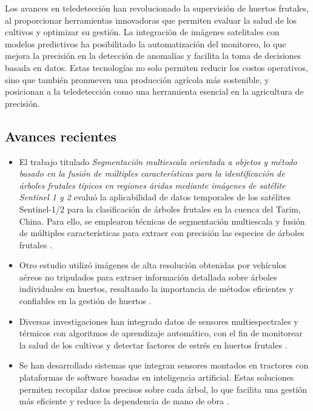 Los avances en teledetección han revolucionado la supervisión de huertos frutales, 
al proporcionar herramientas innovadoras que permiten evaluar la salud de los cultivos
y optimizar su gestión. La integración de imágenes satelitales con modelos predictivos
ha posibilitado la automatización del monitoreo, lo que mejora la precisión en la 
detección de anomalías y facilita la toma de decisiones basada en datos. Estas
tecnologías no solo permiten reducir los costos operativos, sino que también 
promueven una producción agrícola más sostenible, y posicionan a la teledetección 
como una herramienta esencial en la agricultura de precisión.

\subsection{Avances recientes}

\begin{itemize}
  \item El trabajo titulado \textit{Segmentación multiescala orientada a objetos y método basado en la 
  fusión de múltiples características para la identificación de árboles frutales típicos en 
  regiones áridas mediante imágenes de satélite Sentinel 1 y 2} evaluó la aplicabilidad de datos temporales
  de los satélites Sentinel-1/2 para la clasificación de árboles frutales en la
  cuenca del Tarim, China. Para ello, se emplearon técnicas de segmentación multiescala y fusión de
  múltiples características para extraer con precisión las especies de árboles
  frutales \citep{Liang2024}.
  \item Otro estudio utilizó imágenes de alta resolución obtenidas por 
  vehículos aéreos no tripulados para extraer información detallada sobre 
  árboles individuales en huertos, resaltando la importancia de métodos eficientes
  y confiables en la gestión de huertos \citep{Dong2020}.
  \item Diversas investigaciones han integrado datos de sensores multiespectrales y 
  térmicos con algoritmos de aprendizaje automático, con el fin de monitorear la salud 
  de los cultivos y detectar factores de estrés en huertos frutales \citep{Kumar}.
  \item Se han desarrollado sistemas que integran sensores montados en tractores con 
  plataformas de software basadas en inteligencia artificial. Estas soluciones permiten recopilar datos 
  precisos sobre cada árbol, lo que facilita una gestión más eficiente y reduce la 
  dependencia de mano de obra \cite{OrchardRobotics2024}.
\end{itemize}

